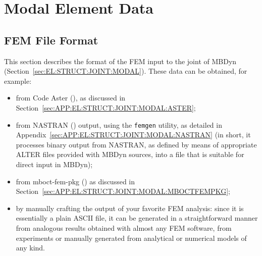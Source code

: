 %
%
%
%
%
% 
%
%

\chapter{Modal Element Data}

\section{FEM File Format}
\label{sec:APP:EL:STRUCT:JOINT:MODAL:FORMAT}

This section describes the format of the FEM input to the 
joint of MBDyn (Section~\ref{sec:EL:STRUCT:JOINT:MODAL}).
These data can be obtained, for example:
\begin{itemize}
\item from Code Aster
(),
as discussed in Section~\ref{sec:APP:EL:STRUCT:JOINT:MODAL:ASTER};
\item from NASTRAN
()
output, using the \texttt{femgen} utility,
as detailed in Appendix~\ref{sec:APP:EL:STRUCT:JOINT:MODAL:NASTRAN}
(in short, it processes binary output from NASTRAN, as defined by means
of appropriate ALTER files provided with MBDyn sources, into a file
that is suitable for direct input in MBDyn);
\item from mboct-fem-pkg
  ()
  as discussed in Section~\ref{sec:APP:EL:STRUCT:JOINT:MODAL:MBOCTFEMPKG};
\item by manually crafting the output of your favorite FEM analysis:
since it is essentially a plain ASCII file, it can be generated
in a straightforward manner from analogous results obtained with
almost any FEM software, from experiments or manually generated
from analytical or numerical models of any kind.
\end{itemize}

